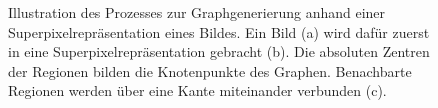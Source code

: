 \begin{figure}[t]
\centering
{}
\caption[Graphgenerierung aus einer Superpixelrepräsentation]{Illustration des Prozesses zur Graphgenerierung anhand einer Superpixelrepräsentation eines Bildes.
Ein Bild (a) wird dafür zuerst in eine Superpixelrepräsentation gebracht (b).
Die absoluten Zentren der Regionen bilden die Knotenpunkte des Graphen.
Benachbarte Regionen werden über eine Kante miteinander verbunden (c).}
\label{fig:superpixel_graph}
\end{figure}
